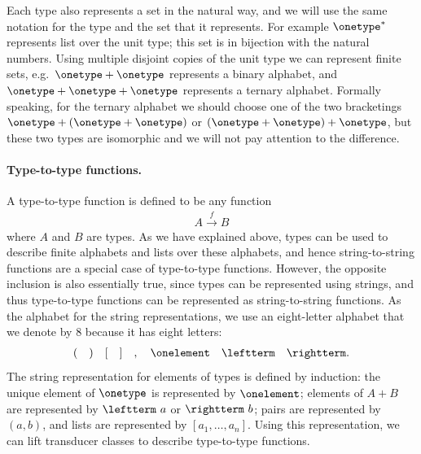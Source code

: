 Each type also represents a set in the natural way, and we will use the same notation for the type and the set that it represents. For example $\onetype^*$ represents list over the unit type; this set is in bijection with the natural numbers. Using multiple disjoint copies of the unit type we can represent finite sets, e.g.~$\onetype + \onetype$ represents a binary alphabet, and $\onetype + \onetype + \onetype$ represents a ternary alphabet. Formally speaking, for the ternary alphabet we should choose one of the two bracketings $\onetype + (\onetype + \onetype)$ or $(\onetype + \onetype) + \onetype$, but these two types are isomorphic and we will not  pay attention to the difference.

\paragraph*{Type-to-type functions.}
A type-to-type function is defined to be  any function 
\begin{align*}
A \xrightarrow f B
\end{align*}
where $A$ and $B$ are types. As we have explained above, types can be used to describe finite alphabets and lists over these alphabets, and hence string-to-string functions are a special case of type-to-type functions.  However, the opposite inclusion is also essentially true, since types can be represented using strings, and thus type-to-type functions can be represented as string-to-string functions.
As the alphabet for the string representations,  we use  an eight-letter alphabet that we denote by $8$ because it has eight letters: 
\begin{align*}
( \quad ) \quad [ \quad ] \quad , \quad \onelement \quad \leftterm \quad \rightterm.
\end{align*}
 The string representation for elements of types is defined by induction:  the unique element of $\onetype$ is represented by  $\onelement$; elements of $A + B$ are represented by $\leftterm\  a$ or $\rightterm\  b$; pairs are represented by $(a,b)$, and lists are represented by $[a_1,\ldots,a_n]$. Using this representation, we can  lift transducer classes to describe type-to-type functions.







